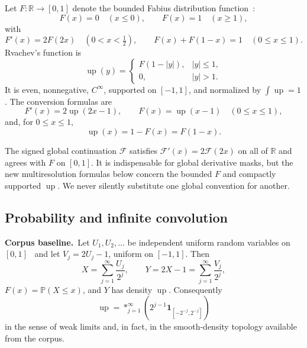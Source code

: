 \documentclass[11pt,oneside]{article}
\theoremstyle{definition}
\theoremstyle{remark}
\newcommand{\R}{\mathbb R}
\newcommand{\Prob}{\mathbb P}
\newcommand{\Up}{\operatorname{up}}
\newcommand{\1}{\mathbf 1}
\newcommand{\baseline}{\textcolor{linkblue}{\textbf{Corpus baseline.}}\ }
\begin{document}
Let $F:\R\to[0,1]$ denote the bounded Fabius distribution function~\cite{fabius1966,arias1982,arias2018}:
\begin{equation}
 F(x)=0\quad(x\le0),\qquad
 F(x)=1\quad(x\ge1),                                      \label{eq:F-boundary}
\end{equation}
with
\begin{equation}
 F'(x)=2F(2x)\quad(0<x<\tfrac12),
 \qquad F(x)+F(1-x)=1\quad(0\le x\le1).                  \label{eq:F-basic}
\end{equation}
Rvachev's function is~\cite{rvachev1971}
\begin{equation}
 \Up(y)=
 \begin{cases}
   F(1-|y|),& |y|\le1,\\
   0,& |y|>1.
 \end{cases}                                             \label{eq:up-definition}
\end{equation}
It is even, nonnegative, $C^\infty$, supported on $[-1,1]$, and normalized by
$\int\Up=1$.  The conversion formulas are
\begin{equation}
 F'(x)=2\Up(2x-1),\qquad
 F(x)=\Up(x-1)\quad(0\le x\le1),                         \label{eq:F-up-conversion}
\end{equation}
and, for $0\le x\le1$,
\begin{equation}
 \Up(x)=1-F(x)=F(1-x).                                   \label{eq:up-survival}
\end{equation}

The signed global continuation $\mathcal F$ satisfies
$\mathcal F'(x)=2\mathcal F(2x)$ on all of $\R$ and agrees with $F$ on
$[0,1]$.  It is indispensable for global derivative masks, but the new
multiresolution formulas below concern the bounded $F$ and compactly supported
$\Up$.  We never silently substitute one global convention for another.

\subsection{Probability and infinite convolution}

\baseline Let $U_1,U_2,\ldots$ be independent uniform random variables on
$[0,1]$~\cite{jessen1935} and let $V_j=2U_j-1$, uniform on $[-1,1]$.  Then
\begin{equation}
 X=\sum_{j=1}^\infty\frac{U_j}{2^j},
 \qquad
 Y=2X-1=\sum_{j=1}^\infty\frac{V_j}{2^j},                \label{eq:random-series}
\end{equation}
$F(x)=\Prob(X\le x)$, and $Y$ has density $\Up$.  Consequently
\begin{equation}
 \Up=\mathop{\ast}_{j=1}^{\infty}
 \left(2^{j-1}\1_{[-2^{-j},2^{-j}]}
 \right)              \label{eq:infinite-convolution}
\end{equation}
in the sense of weak limits and, in fact, in the smooth-density topology
available from the corpus.
\end{document}
